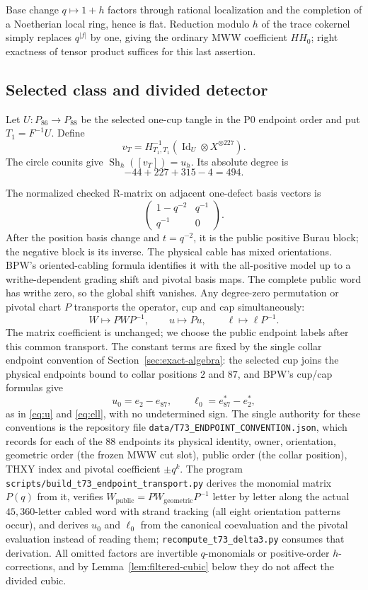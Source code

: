 \documentclass[11pt]{amsart}
\theoremstyle{definition}
\theoremstyle{remark}
\begin{document}
Base change $q\mapsto1+h$ factors through rational localization and the
completion of a Noetherian local ring, hence is flat.  Reduction modulo $h$
of the trace cokernel simply replaces $q^{|f|}$ by one, giving the ordinary
MWW coefficient $HH_0$; right exactness of tensor product suffices for this
last assertion.

\subsection{Selected class and divided detector}

Let $U:P_{86}\to P_{88}$ be the selected one-cup tangle in the P0 endpoint
order and put $T_1=F^{-1}U$.  Define
\[
v_T=H_{T_1,T_1}^{-1}
  (\operatorname{Id}_U\otimes X^{\otimes227}).
\]
The circle counits give
$\operatorname{Sh}_h([v_T])=u_h$.  Its absolute degree is
\[
-44+227+315-4=494.
\]

The normalized checked R-matrix on adjacent one-defect basis vectors is
\[
\begin{pmatrix}1-q^{-2}&q^{-1}\\q^{-1}&0\end{pmatrix}.
\]
After the position basis change and $t=q^{-2}$, it is the public positive
Burau block; the negative block is its inverse.  The physical cable has mixed
orientations.  BPW's oriented-cabling formula identifies it with the
all-positive model up to a writhe-dependent grading shift and pivotal basis
maps.  The complete public word has writhe zero, so the global shift
vanishes.  Any degree-zero permutation or pivotal chart $P$ transports the
operator, cup and cap simultaneously:
\[
W\mapsto PWP^{-1},\qquad u\mapsto Pu,\qquad
\ell\mapsto\ell P^{-1}.
\]
The matrix coefficient is unchanged; we choose the public endpoint labels
after this common transport.  The constant terms are fixed by the single
collar endpoint convention of Section~\ref{sec:exact-algebra}: the selected
cup joins the physical endpoints bound to collar positions $2$ and $87$, and
BPW's cup/cap formulas give
\[
u_0=e_2-e_{87},\qquad
\ell_0=e_{87}^*-e_2^*,
\]
as in \eqref{eq:u} and \eqref{eq:ell}, with no undetermined sign.  The
single authority for these conventions is the repository file
\texttt{data/T73\_ENDPOINT\_CONVENTION.json}, which records for each of the
$88$ endpoints its physical identity, owner, orientation, geometric order
(the frozen MWW cut slot), public order (the collar position), THXY index
and pivotal coefficient $\pm q^k$.  The program
\texttt{scripts/build\_t73\_endpoint\_transport.py} derives the monomial
matrix $P(q)$ from it, verifies
$W_{\mathrm{public}}=PW_{\mathrm{geometric}}P^{-1}$ letter by letter along
the actual $45{,}360$-letter cabled word with strand tracking (all eight
orientation patterns occur), and derives $u_0$ and $\ell_0$ from the
canonical coevaluation and the pivotal evaluation instead of reading them;
\texttt{recompute\_t73\_delta3.py} consumes that derivation.  All
omitted factors are invertible $q$-monomials or positive-order
$h$-corrections, and by Lemma~\ref{lem:filtered-cubic} below they do not
affect the divided cubic.
\end{document}

